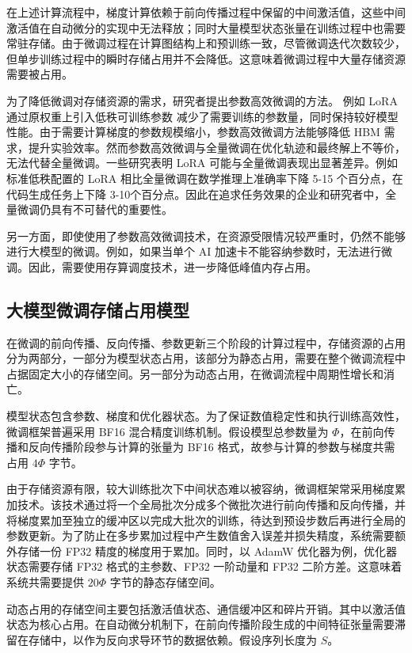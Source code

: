 \documentclass[bachelor,openany,oneside,color,AutoFakeBold=true]{buaathesis}
\begin{document}
在上述计算流程中，梯度计算依赖于前向传播过程中保留的中间激活值，这些中间激活值在自动微分的实现中无法释放；同时大量模型状态张量在训练过程中也需要常驻存储。由于微调过程在计算图结构上和预训练一致，尽管微调迭代次数较少，但单步训练过程中的瞬时存储占用并不会降低。这意味着微调过程中大量存储资源需要被占用。

为了降低微调对存储资源的需求，研究者提出参数高效微调的方法。 例如 LoRA 通过原权重上引入低秩可训练参数 减少了需要训练的参数量，同时保持较好模型性能。由于需要计算梯度的参数规模缩小，参数高效微调方法能够降低 HBM 需求，提升实验效率。然而参数高效微调与全量微调在优化轨迹和最终解上不等价，无法代替全量微调。一些研究表明 LoRA 可能与全量微调表现出显著差异。例如标准低秩配置的 LoRA 相比全量微调在数学推理上准确率下降 5-15 个百分点，在代码生成任务上下降 3-10个百分点。因此在追求任务效果的企业和研究者中，全量微调仍具有不可替代的重要性。

另一方面，即使使用了参数高效微调技术，在资源受限情况较严重时，仍然不能够进行大模型的微调。例如，如果当单个 AI 加速卡不能容纳参数时，无法进行微调。因此，需要使用存算调度技术，进一步降低峰值内存占用。


\subsection{大模型微调存储占用模型}

在微调的前向传播、反向传播、参数更新三个阶段的计算过程中，存储资源的占用分为两部分，一部分为模型状态占用，该部分为静态占用，需要在整个微调流程中占据固定大小的存储空间。另一部分为动态占用，在微调流程中周期性增长和消亡。

模型状态包含参数、梯度和优化器状态。为了保证数值稳定性和执行训练高效性，微调框架普遍采用 BF16 混合精度训练机制。假设模型总参数量为 $\Phi$，在前向传播和反向传播阶段参与计算的张量为 BF16 格式，故参与计算的参数与梯度共需占用 $4\Phi$ 字节。

由于存储资源有限，较大训练批次下中间状态难以被容纳，微调框架常采用梯度累加技术。该技术通过将一个全局批次分成多个微批次进行前向传播和反向传播，并将梯度累加至独立的缓冲区以完成大批次的训练，待达到预设步数后再进行全局的参数更新。为了防止在多步累加过程中产生数值舍入误差并损失精度，系统需要额外存储一份 FP32 精度的梯度用于累加。同时，以 AdamW 优化器为例，优化器状态需要存储 FP32 格式的主参数、FP32 一阶动量和 FP32 二阶方差。这意味着系统共需要提供 $20\Phi$ 字节的静态存储空间。

动态占用的存储空间主要包括激活值状态、通信缓冲区和碎片开销。其中以激活值状态为核心占用。在自动微分机制下，在前向传播阶段生成的中间特征张量需要滞留在存储中，以作为反向求导环节的数据依赖。假设序列长度为 $S$。
\end{document}
